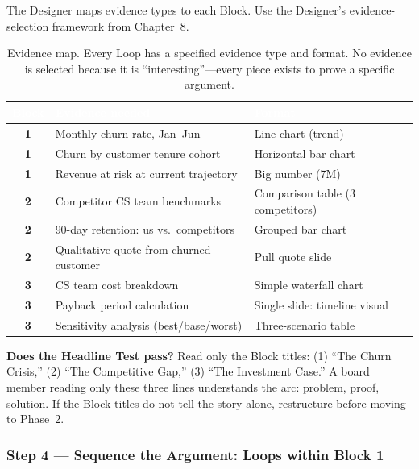 The Designer maps evidence types to each Block. Use the Designer's evidence-selection framework from Chapter~8.

\begin{table}[H]
\centering
\small
{}
\begin{tabularx}{\textwidth}{>{\bfseries\color{heading}}c X X}
\toprule
\rowcolor{tableheader}
\textcolor{white}{\textbf{Block}} & \textcolor{white}{\textbf{Evidence needed}} & \textcolor{white}{\textbf{Format}} \\
\midrule
1 & Monthly churn rate, Jan--Jun & Line chart (trend) \\
1 & Churn by customer tenure cohort & Horizontal bar chart \\
1 & Revenue at risk at current trajectory & Big number (\texteuro{}7M) \\
2 & Competitor CS team benchmarks & Comparison table (3 competitors) \\
2 & 90-day retention: us vs.\ competitors & Grouped bar chart \\
2 & Qualitative quote from churned customer & Pull quote slide \\
3 & CS team cost breakdown & Simple waterfall chart \\
3 & Payback period calculation & Single slide: timeline visual \\
3 & Sensitivity analysis (best/base/worst) & Three-scenario table \\
\bottomrule
\end{tabularx}
\caption{Evidence map. Every Loop has a specified evidence type and format. No evidence is selected because it is ``interesting''---every piece exists to prove a specific argument.}
\end{table}

\begin{insightbox}
\textbf{Does the Headline Test pass?} Read only the Block titles: (1) ``The Churn Crisis,'' (2) ``The Competitive Gap,'' (3) ``The Investment Case.'' A board member reading only these three lines understands the arc: problem, proof, solution. If the Block titles do not tell the story alone, restructure before moving to Phase~2.
\end{insightbox}

\subsubsection*{Step 4 --- Sequence the Argument: Loops within Block 1}

